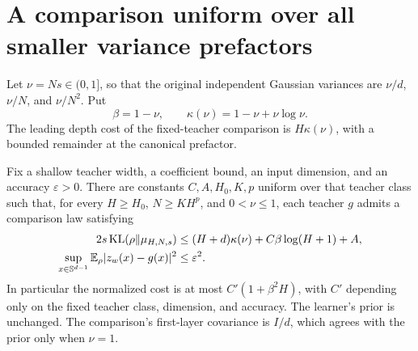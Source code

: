 \section{A comparison uniform over all smaller variance prefactors}
\label{sec:prefactor-echo}
Let $\nu=Ns\in(0,1]$, so that the original independent Gaussian variances are $\nu/d$, $\nu/N$, and $\nu/N^2$. Put
\[
 \beta=1-\nu,\qquad \kappa(\nu)=1-\nu+\nu\log\nu.
\]
The leading depth cost of the fixed-teacher comparison is $H\kappa(\nu)$, with a bounded remainder at the canonical prefactor.

\begin{theorem}
\label{thm:prefactor-echo}
Fix a shallow teacher width, a coefficient bound, an input dimension, and an accuracy $\varepsilon>0$. There are constants $C,A,H_0,K,p$ uniform over that teacher class such that, for every $H\ge H_0$, $N\ge KH^p$, and $0<\nu\le1$, each teacher $g$ admits a comparison law satisfying
\begin{align*}
 2s\operatorname{KL}(\rho\|\mu_{H,N,s})
 &\le (H+d)\kappa(\nu)+C\beta\log(H+1)+A,\\
 \sup_{x\in\mathbb S^{d-1}}\mathbb E_\rho|z_w(x)-g(x)|^2&\le\varepsilon^2.
\end{align*}
In particular the normalized cost is at most $C'(1+\beta^2H)$, with $C'$ depending only on the fixed teacher class, dimension, and accuracy. The learner's prior is unchanged. The comparison's first-layer covariance is $I/d$, which agrees with the prior only when $\nu=1$.
\end{theorem}
